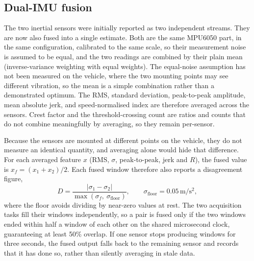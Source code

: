 \subsection{Dual-IMU fusion}
\label{sec:imu-fusion}

The two inertial sensors were initially reported as two independent streams. They are now also fused into a single estimate. Both are the same MPU6050 part, in the same configuration, calibrated to the same scale, so their measurement noise is assumed to be equal, and the two readings are combined by their plain mean (inverse-variance weighting with equal weights). The equal-noise assumption has not been measured on the vehicle, where the two mounting points may see different vibration, so the mean is a simple combination rather than a demonstrated optimum. The RMS, standard deviation, peak-to-peak amplitude, mean absolute jerk, and speed-normalised index are therefore averaged across the sensors. Crest factor and the threshold-crossing count are ratios and counts that do not combine meaningfully by averaging, so they remain per-sensor.

Because the sensors are mounted at different points on the vehicle, they do not measure an identical quantity, and averaging alone would hide that difference. For each averaged feature $x$ (RMS, $\sigma$, peak-to-peak, jerk and $R$), the fused value is $x_f = (x_1 + x_2)/2$. Each fused window therefore also reports a disagreement figure,
\begin{equation}
D = \frac{\lvert \sigma_1 - \sigma_2 \rvert}{\max(\sigma_f,\ \sigma_{\mathrm{floor}})}, \qquad \sigma_{\mathrm{floor}} = 0.05\,\mathrm{m/s^2},
\label{eq:disagreement}
\end{equation}
where the floor avoids dividing by near-zero values at rest. The two acquisition tasks fill their windows independently, so a pair is fused only if the two windows ended within half a window of each other on the shared microsecond clock, guaranteeing at least 50\% overlap. If one sensor stops producing windows for three seconds, the fused output falls back to the remaining sensor and records that it has done so, rather than silently averaging in stale data.

